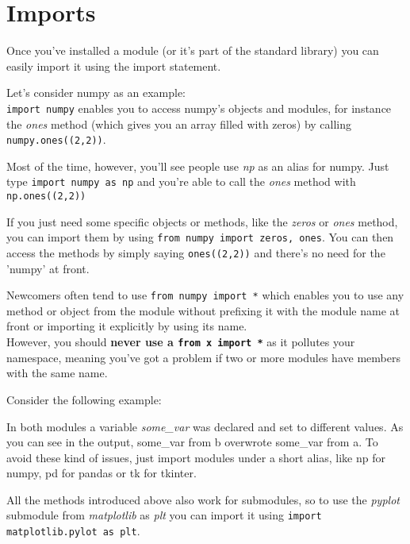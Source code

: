 \section{Imports}

  Once you've installed a module (or it's part of the standard library) you can
  easily import it using the import statement.

  Let's consider numpy as an example:\\
  \texttt{import numpy} enables you to access numpy's objects and modules, 
  for instance the \textit{ones} method (which gives you an array filled with zeros)
  by calling \texttt{numpy.ones((2,2))}.

  Most of the time, however, you'll see people use \textit{np} as an alias for numpy.
  Just type \texttt{import numpy as np} and you're able to call the
  \textit{ones} method with \texttt{np.ones((2,2))}

  If you just need some specific objects or methods, like the \textit{zeros} or \textit{ones} method,
  you can import them by using \texttt{from numpy import zeros, ones}.
  You can then access the methods by simply saying
  \texttt{ones((2,2))} and there's no need for the 'numpy' at front.

  Newcomers often tend to use \texttt{from numpy import *} which
  enables you to use any method or object from the module without prefixing
  it with the module name at front or importing it explicitly by using its name.\\
  However, you should \textbf{never use a \texttt{from x import *}}
  as it pollutes your namespace, meaning you've got a problem if
  two or more modules have members with the same name.

  Consider the following example:

  In both modules a variable \textit{some\_var} was declared and set to different values.
  As you can see in the output, some\_var from b overwrote some\_var from a.
  To avoid these kind of issues, just import modules under a short alias, like
  np for numpy, pd for pandas or tk for tkinter.

  All the methods introduced above also work for submodules, so to use the \textit{pyplot} submodule
  from \textit{matplotlib} as \textit{plt} you can import it using
  \texttt{import matplotlib.pylot as plt}.%
